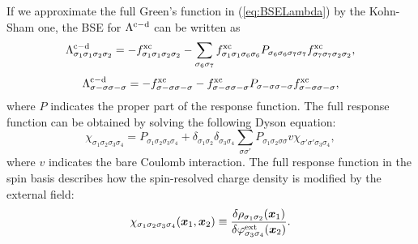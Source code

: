 %
%
%
If we approximate the full Green's function in (\ref{eq:BSELambda}) by the Kohn-Sham one, 
the BSE for $\Lambda^{\rm c - \rm d}$ can be written as
\begin{equation}
	\Lambda^{\rm c - \rm d}_{\sigma_1\sigma_1\sigma_2\sigma_2} = -f^{\rm xc}_{\sigma_1\sigma_1\sigma_2\sigma_2} 
	- \sum_{\sigma_6\sigma_7}f^{\rm xc }_{\sigma_1\sigma_1\sigma_6\sigma_6}
	P_{\sigma_6\sigma_6\sigma_7\sigma_7}f^{\rm xc}_{\sigma_7\sigma_7\sigma_2\sigma_2},
	\label{eq:longlambda}
\end{equation}
%
\begin{equation}
	\Lambda^{\rm c - \rm d}_{\sigma-\sigma\sigma-\sigma} = -f^{\rm xc}_{\sigma-\sigma\sigma-\sigma} 
	- f^{\rm xc }_{\sigma-\sigma\sigma-\sigma}
	P_{\sigma-\sigma\sigma-\sigma}f^{\rm xc}_{\sigma-\sigma\sigma-\sigma},
	\label{eq:translambda}
\end{equation}
%
where $P$ indicates the proper part of the response function. The full response function can be obtained
by solving the following Dyson equation:
%
\begin{equation}
	\chi_{\sigma_1\sigma_2\sigma_3\sigma_4} = P_{\sigma_1\sigma_2\sigma_3\sigma_4}
	+ \delta_{\sigma_1\sigma_2}\delta_{\sigma_3\sigma_4} \sum_{\sigma\sigma'}
	P_{\sigma_1\sigma_2\sigma\sigma}v\chi_{\sigma'\sigma'\sigma_3\sigma_4},
	\label{eq:chiDyson}
\end{equation}
%
where $v$ indicates the bare Coulomb interaction.
The full response function in the spin basis describes how the spin-resolved charge density is modified
by the external field:
%
\begin{equation}
	\chi_{\sigma_1\sigma_2\sigma_3\sigma_4}(\bm x_1,\bm x_2) \equiv
	\frac{\delta\rho_{\sigma_1\sigma_2}(\bm x_1)}{\delta\varphi^{\rm ext}_{\sigma_3\sigma_4}(\bm x_2)}.
	\label{eq:spinchi}
\end{equation}
